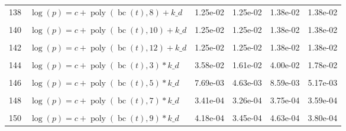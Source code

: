 \documentclass[12pt,a4paper]{article}
\DeclareMathOperator{\bc}{bc}
\DeclareMathOperator{\poly}{poly}
\begin{document}
\begin{longtable}[t]{ll>{\raggedleft\arraybackslash}p{2cm}>{\raggedleft\arraybackslash}p{2cm}>{\raggedleft\arraybackslash}p{2cm}>{\raggedleft\arraybackslash}p{2cm}}
138 & $\log(p) = c + \poly\left( \bc(t), 8 \right) + k\_d$ & 1.25e-02 & 1.25e-02 & 1.38e-02 & 1.38e-02\\
\cellcolor{gray!6}{139} & \cellcolor{gray!6}{$\log(p) = c + \poly\left( \bc(t), 9 \right) + k\_d$} & \cellcolor{gray!6}{1.25e-02} & \cellcolor{gray!6}{1.25e-02} & \cellcolor{gray!6}{1.38e-02} & \cellcolor{gray!6}{1.38e-02}\\
140 & $\log(p) = c + \poly\left( \bc(t), 10 \right) + k\_d$ & 1.25e-02 & 1.25e-02 & 1.38e-02 & 1.38e-02\\
\cellcolor{gray!6}{141} & \cellcolor{gray!6}{$\log(p) = c + \poly\left( \bc(t), 11 \right) + k\_d$} & \cellcolor{gray!6}{1.25e-02} & \cellcolor{gray!6}{1.25e-02} & \cellcolor{gray!6}{1.38e-02} & \cellcolor{gray!6}{1.38e-02}\\
142 & $\log(p) = c + \poly\left( \bc(t), 12 \right) + k\_d$ & 1.25e-02 & 1.25e-02 & 1.38e-02 & 1.38e-02\\
\cellcolor{gray!6}{143} & \cellcolor{gray!6}{$\log(p) = c + \poly\left( \bc(t), 13 \right) + k\_d$} & \cellcolor{gray!6}{1.25e-02} & \cellcolor{gray!6}{1.25e-02} & \cellcolor{gray!6}{1.38e-02} & \cellcolor{gray!6}{1.38e-02}\\
144 & $\log(p) = c + \poly\left( \bc(t), 3 \right) * k\_d$ & 3.58e-02 & 1.61e-02 & 4.00e-02 & 1.78e-02\\
\cellcolor{gray!6}{145} & \cellcolor{gray!6}{$\log(p) = c + \poly\left( \bc(t), 4 \right) * k\_d$} & \cellcolor{gray!6}{1.87e-02} & \cellcolor{gray!6}{1.86e-02} & \cellcolor{gray!6}{2.08e-02} & \cellcolor{gray!6}{2.07e-02}\\
146 & $\log(p) = c + \poly\left( \bc(t), 5 \right) * k\_d$ & 7.69e-03 & 4.63e-03 & 8.59e-03 & 5.17e-03\\
\cellcolor{gray!6}{147} & \cellcolor{gray!6}{$\log(p) = c + \poly\left( \bc(t), 6 \right) * k\_d$} & \cellcolor{gray!6}{6.99e-04} & \cellcolor{gray!6}{6.53e-04} & \cellcolor{gray!6}{7.79e-04} & \cellcolor{gray!6}{7.27e-04}\\
148 & $\log(p) = c + \poly\left( \bc(t), 7 \right) * k\_d$ & 3.41e-04 & 3.26e-04 & 3.75e-04 & 3.59e-04\\
\cellcolor{gray!6}{149} & \cellcolor{gray!6}{$\log(p) = c + \poly\left( \bc(t), 8 \right) * k\_d$} & \cellcolor{gray!6}{4.17e-04} & \cellcolor{gray!6}{3.88e-04} & \cellcolor{gray!6}{4.62e-04} & \cellcolor{gray!6}{4.29e-04}\\
150 & $\log(p) = c + \poly\left( \bc(t), 9 \right) * k\_d$ & 4.18e-04 & 3.45e-04 & 4.63e-04 & 3.80e-04\\

\end{longtable}
\end{document}
